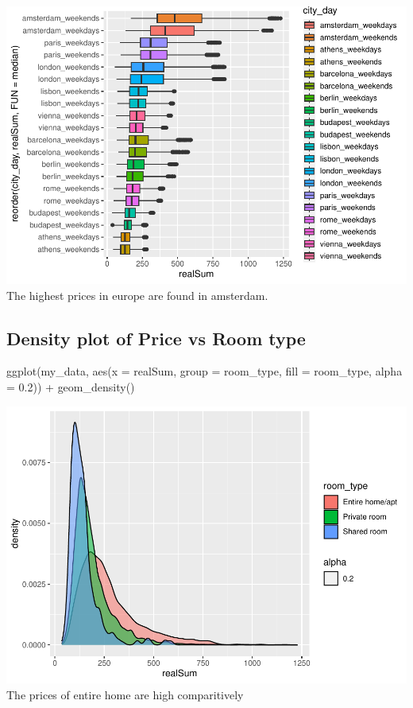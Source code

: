 \documentclass[
]{article}
\newenvironment{Shaded}{\begin{snugshade}}{\end{snugshade}}
\newcommand{\AttributeTok}[1]{\textcolor[rgb]{0.77,0.63,0.00}{#1}}
\newcommand{\FloatTok}[1]{\textcolor[rgb]{0.00,0.00,0.81}{#1}}
\newcommand{\FunctionTok}[1]{\textcolor[rgb]{0.00,0.00,0.00}{#1}}
\newcommand{\NormalTok}[1]{#1}
\newcommand{\SpecialCharTok}[1]{\textcolor[rgb]{0.00,0.00,0.00}{#1}}
\begin{document}
\includegraphics{Project_Prelim_report_files/figure-latex/unnamed-chunk-4-1.pdf}
The highest prices in europe are found in amsterdam.

\hypertarget{density-plot-of-price-vs-room-type}{%
\subsection{Density plot of Price vs Room
type}\label{density-plot-of-price-vs-room-type}}

\begin{Shaded}
\begin{Highlighting}[]
\FunctionTok{ggplot}\NormalTok{(my\_data, }\FunctionTok{aes}\NormalTok{(}\AttributeTok{x =}\NormalTok{ realSum, }\AttributeTok{group =}\NormalTok{ room\_type, }\AttributeTok{fill =}\NormalTok{ room\_type,}
    \AttributeTok{alpha =} \FloatTok{0.2}\NormalTok{)) }\SpecialCharTok{+} \FunctionTok{geom\_density}\NormalTok{()}
\end{Highlighting}
\end{Shaded}

\includegraphics{Project_Prelim_report_files/figure-latex/unnamed-chunk-5-1.pdf}
The prices of entire home are high comparitively
\end{document}
